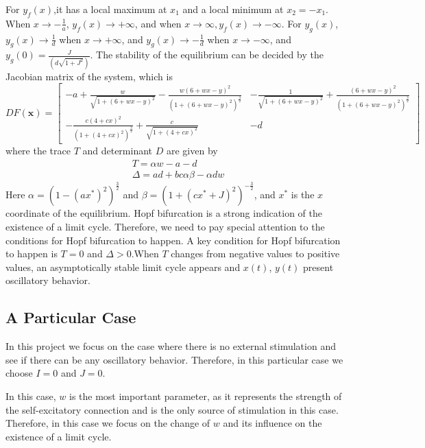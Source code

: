 \documentclass[12pt]{article}
\begin{document}
\indent For $y_f(x)$,it has a local maximum at $x_1$ and a local minimum at $x_2=-x_1$. When $x\to -\frac{1}{a}$, $y_f(x)\to+\infty$, and when $x\to \infty,y_f(x)\to -\infty$.
\newline
\indent For $y_g(x)$, $y_g(x)\to \frac{1}{d}$ when $x\to +\infty$, and $y_g(x)\to-\frac{1}{d}$ when $x\to-\infty$, and $y_g(0)=\frac{J}{(d\sqrt{1+J^2})}$.
\newline
\indent The stability of the equilibrium can be decided by the Jacobian matrix of the system, which is
\begin{equation}
  DF(\mathbf{x})=
  \left[
    \begin{matrix}
      -a+\frac{w}{\sqrt{1+(6+wx-y)^2}}-\frac{w(6+wx-y)^2}{(1+(6+wx-y)^2)^{\frac{3}{2}}}&-\frac{1}{\sqrt{1+(6+wx-y)^2}}+\frac{(6+wx-y)^2}{(1+(6+wx-y)^2)^{\frac{3}{2}}}
      \\
      -\frac{c(4+cx)^2}{(1+(4+cx)^2)^{\frac{3}{2}}}+\frac{c}{\sqrt{1+(4+cx)^2}}&-d      
    \end{matrix}
  \right]
\end{equation}
where the trace $T$ and determinant $D$ are given by
\begin{equation}
  \begin{matrix}
    T=\alpha w -a-d
    \\
    \Delta= ad+bc\alpha \beta-\alpha dw
  \end{matrix}
\end{equation}
\indent Here $\alpha =(1-(ax^{*})^{2})^{\frac{3}{2}}$ and $\beta =(1+(cx^*+J)^2)^{-\frac{3}{2}}$, and $x^*$ is the $x$ coordinate of the equilibrium. 
\newline
\indent Hopf bifurcation is a strong indication of the existence of a limit cycle. Therefore, we need to pay special attention to the conditions for Hopf bifurcation to happen. A key condition for Hopf bifurcation to happen is $T=0$ and $\Delta>0$.When $T$ changes from negative values to positive values, an asymptotically stable limit cycle appears and $x(t)$, $y(t)$ present oscillatory behavior. 
\subsection{A Particular Case}
\indent In this project we focus on the case where there is no external stimulation and see if there can be any oscillatory behavior. Therefore, in this particular case  we choose $I=0$ and $J=0$. 

In this case, $w$ is the most important parameter, as it represents the strength of the self-excitatory connection and is the only source of stimulation in this case. Therefore, in this case we focus on the change of $w$ and its influence on the existence of a limit cycle. 
\end{document}
